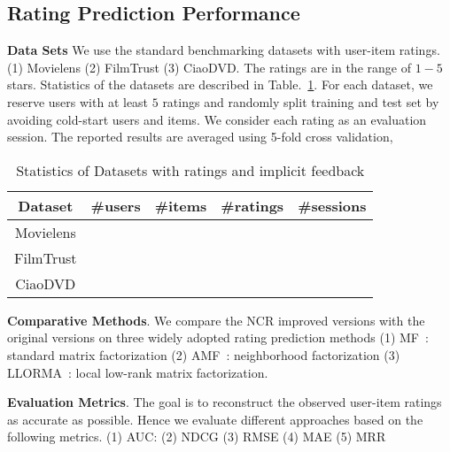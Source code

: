 \documentclass[letterpaper]{article} %
\begin{document}
\subsection{Rating Prediction Performance}

\textbf{Data Sets} We use the standard benchmarking datasets with user-item ratings. (1) Movielens (2) FilmTrust (3) CiaoDVD. The ratings are in the range of $1-5$ stars. Statistics of the datasets are described in Table.~\ref{tab:datasets}. For each dataset, we reserve users with at least $5$ ratings and randomly split training and test set by avoiding cold-start users and items. We consider each rating as an evaluation session. The reported results are averaged using 5-fold cross validation, 

\begin{table}[htp]
\caption{Statistics of Datasets with ratings and implicit feedback}
\begin{center}
\begin{tabular}{|c|c|c|c|c|}
\hline
Dataset & \#users & \#items & \#ratings & \#sessions \\\hline
Movielens & & & & \\\hline
FilmTrust & & & & \\\hline
CiaoDVD & & & & \\\hline
\end{tabular}
\end{center}
\label{tab:datasets}
\end{table}%
 

\textbf{Comparative Methods}. We compare the NCR improved versions with the original versions on three widely adopted rating prediction methods (1) MF~\cite{Koren2009Matrix}: standard matrix factorization  (2) AMF~\cite{Koren2008Factorization}: neighborhood factorization (3) LLORMA~\cite{Lee2013Local}: local low-rank matrix factorization. 

\textbf{Evaluation Metrics}.  The goal is to reconstruct the observed user-item ratings as accurate as possible. Hence we evaluate different approaches based on the following metrics. (1) AUC: (2) NDCG (3) RMSE (4) MAE (5) MRR
\end{document}
